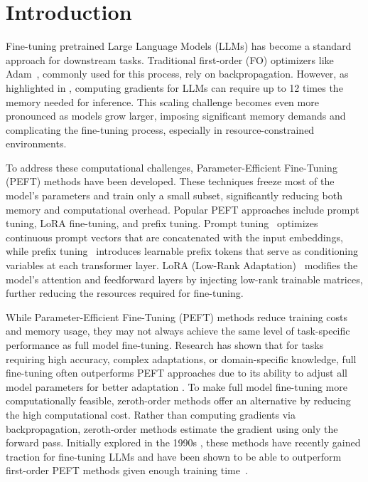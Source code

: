 \section{Introduction}

Fine-tuning pretrained Large Language Models (LLMs) has become a standard approach for downstream tasks. Traditional first-order (FO) optimizers like Adam~\cite{AdamKingmaB14}, commonly used for this process, rely on backpropagation. However, as highlighted in \citet{MalladiGNDL0A23Mezo}, computing gradients for LLMs can require up to 12 times the memory needed for inference. This scaling challenge becomes even more pronounced as models grow larger, imposing significant memory demands and complicating the fine-tuning process, especially in resource-constrained environments.

To address these computational challenges, Parameter-Efficient Fine-Tuning (PEFT) methods have been developed. These techniques freeze most of the model’s parameters and train only a small subset, significantly reducing both memory and computational overhead. Popular PEFT approaches include prompt tuning, LoRA fine-tuning, and prefix tuning. Prompt tuning~\cite{LesterAC21PromptTuning, QinE21PromptTuning,YuCL023} optimizes continuous prompt vectors that are concatenated with the input embeddings, while prefix tuning~\cite{LiL20PrefixTuning} introduces learnable prefix tokens that serve as conditioning variables at each transformer layer. LoRA (Low-Rank Adaptation)~\cite{HuSWALWWC22LORA, HoulsbyGJMLGAG19LORA} modifies the model's attention and feedforward layers by injecting low-rank trainable matrices, further reducing the resources required for fine-tuning.

While Parameter-Efficient Fine-Tuning (PEFT) methods reduce training costs and memory usage, they may not always achieve the same level of task-specific performance as full model fine-tuning. Research has shown that for tasks requiring high accuracy, complex adaptations, or domain-specific knowledge, full fine-tuning often outperforms PEFT approaches due to its ability to adjust all model parameters for better adaptation \cite{HuSWALWWC22LORA,LiL20PrefixTuning,ZakenGR22}. To make full model fine-tuning more computationally feasible, zeroth-order methods offer an alternative by reducing the high computational cost. Rather than computing gradients via backpropagation, zeroth-order methods estimate the gradient using only the forward pass. Initially explored in the 1990s \cite{Spall92, NesterovS17, GhadimiL13a, DuchiJWW15, LiuCKZHV20}, these methods have recently gained traction for fine-tuning LLMs \cite{MalladiGNDL0A23Mezo, DeLiMaSo23, LingCYL024} and have been shown to be able to outperform first-order PEFT methods given enough training time~\cite{ZhangLHLZZCLY0W24Zobench}.

